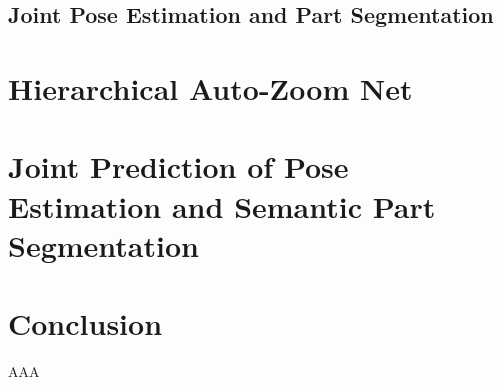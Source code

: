 \subsection{Joint Pose Estimation and Part Segmentation}

\section{Hierarchical Auto-Zoom Net}
\label{sec:hazn}

\section{Joint Prediction of Pose Estimation and Semantic Part Segmentation}
\label{sec:pose_and_seg}

\section{Conclusion}

\begin{acknowledgements}
AAA
\end{acknowledgements}


